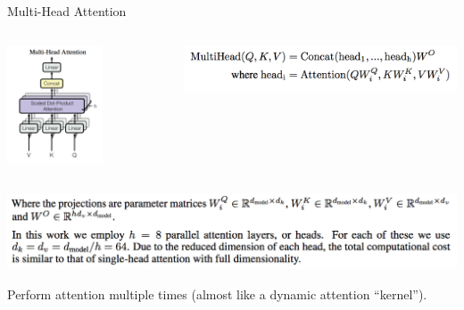 \documentclass{beamer}
\begin{document}
\begin{frame}{Multi-Head Attention}{}
\centering
\begin{columns}[T] %
\begin{column}{.38\textwidth}
\centering
\includegraphics[width=0.6\textwidth]{img/multi_attn_fig.png}
\end{column}%
\hfill%
\begin{column}{.58\textwidth}
\begin{minipage}[c][.4\textheight][c]{\linewidth}
\includegraphics[width=\textwidth]{img/multi_attn_eq.png}
\end{minipage}
\end{column}%
\end{columns}

\includegraphics[width=\textwidth]{img/multi_attn_text.png}

Perform attention multiple times (almost like a dynamic attention ``kernel'').
\end{frame}
%
\end{document}
